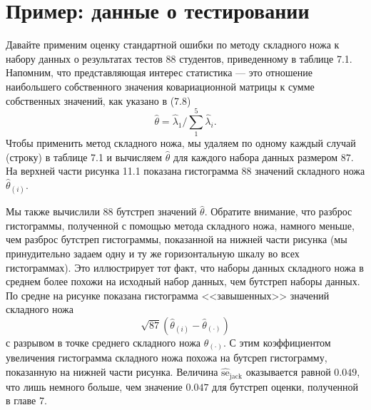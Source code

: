 \section{Пример: данные о тестировании}
Давайте применим оценку стандартной ошибки по методу складного ножа к набору данных о результатах тестов $88$ студентов, приведенному в таблице 7.1. Напомним, что представляющая интерес статистика --- это отношение наибольшего собственного значения ковариационной матрицы к сумме собственных значений, как указано в (7.8)
\begin{equation}\label{eq11.12}
    \hat{\theta} = \hat{\lambda}_{1}/\sum\limits_{1}^{5}\hat{\lambda}_{i}.
\end{equation}
Чтобы применить метод складного ножа, мы удаляем по одному каждый случай (строку) в таблице 7.1 и вычисляем $\hat{\theta}$ для каждого набора данных размером $87$. На верхней части рисунка 11.1 показана гистограмма $88$ значений складного ножа $\hat{\theta}_{(i)}$.

Мы также вычислили $88$ бутстреп значений $\hat{\theta}$. Обратите внимание, что разброс гистограммы, полученной с помощью метода складного ножа, намного меньше, чем разброс бутстреп гистограммы, показанной на нижней части рисунка (мы принудительно задаем одну и ту же горизонтальную шкалу во всех гистограммах). Это иллюстрирует тот факт, что наборы данных складного ножа в среднем более похожи на исходный набор данных, чем бутстреп наборы данных. По средне на рисунке показана гистограмма <<завышенных>> значений складного ножа
\begin{equation}\label{eq11.13}
    \sqrt{87}(\hat{\theta}_{(i)} - \hat{\theta}_{(\cdot)})
\end{equation}
с разрывом в точке среднего складного ножа $\hat{\theta}_{(\cdot)}$. С этим коэффициентом увеличения гистограмма складного ножа похожа на бутсреп гистограмму, показанную на нижней части рисунка. Величина $\widehat{\text{se}}_{\text{jack}}$ оказывается равной $0.049$, что лишь немного больше, чем значение $0.047$ для бутстреп оценки, полученной в главе 7.

